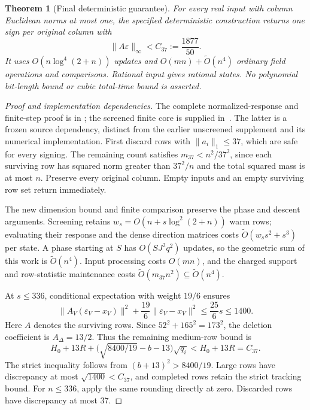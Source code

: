 \documentclass[11pt]{amsart}
\newtheorem{theorem}{Theorem}[section]
\theoremstyle{definition}\newtheorem{definition}[theorem]{Definition}
\theoremstyle{remark}\newtheorem{remark}[theorem]{Remark}
\numberwithin{equation}{section}
\begin{document}
\begin{theorem}[Final deterministic guarantee]\label{fin:guarantee}
For every real input with column Euclidean norms at most one, the
specified deterministic construction returns one sign per original
column with
\[
 \|A\varepsilon\|_\infty<C_{37}:=\frac{1877}{50}.
\]
It uses $O(n\log^4(2+n))$ updates and
$O(mn)+\widetilde O(n^4)$ ordinary field operations and comparisons.
Rational input gives rational states. No polynomial bit-length bound
or cubic total-time bound is asserted.
\end{theorem}
\begin{proof}[Proof and implementation dependencies]
The complete normalized-response and finite-step proof is in
\cite{Final37}; the screened finite core is supplied in~\cite{Screened67}.
The latter is a frozen source dependency, distinct from the earlier
unscreened supplement and its numerical implementation.
First discard rows with $\|a_i\|_1\le37$, which are safe for every
signing. The remaining count satisfies $m_{37}<n^2/37^2$, since each
surviving row has squared norm greater than $37^2/n$ and the total
squared mass is at most $n$. Preserve every original column. Empty
inputs and an empty surviving row set return immediately.

The new dimension bound and finite comparison preserve the phase and
descent arguments. Screening retains $w_s=O(n+s\log^2(2+n))$ warm
rows; evaluating their response and the dense direction matrices costs
$\widetilde O(w_ss^2+s^3)$ per state. A phase starting at $S$ has
$O(SJ^2q^2)$ updates, so the geometric sum of this work is
$\widetilde O(n^4)$. Input processing costs $O(mn)$, and the charged
support and row-statistic maintenance costs
$\widetilde O(m_{37}n^2)\subseteq\widetilde O(n^4)$.

At $s\le336$, conditional expectation with weight $19/6$ ensures
\begin{equation}\label{fin:rounding}
 \|A_V(\varepsilon_V-x_V)\|^2+\frac{19}{6}\|\varepsilon_V-x_V\|^2
 \le\frac{25}{6}s\le1400.
\end{equation}
Here $A$ denotes the surviving rows. Since $52^2+165^2=173^2$,
the deletion coefficient is $A_\Delta=13/2$.
Thus the remaining medium-row bound is
\[
 H_0+13R+\bigl(\sqrt{8400/19}-b-13\bigr)\sqrt{q_i}<H_0+13R=C_{37}.
\]
The strict inequality follows from $(b+13)^2>8400/19$.
Large rows have discrepancy at most $\sqrt{1400}<C_{37}$, and completed
rows retain the strict tracking bound. For $n\le336$, apply the same
rounding directly at zero. Discarded rows have discrepancy at most 37.
\end{proof}
\end{document}

